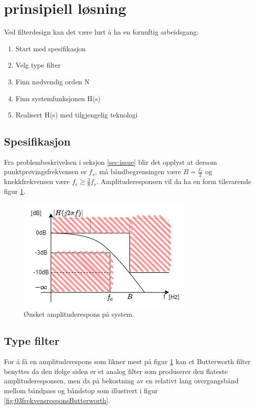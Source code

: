 \section{prinsipiell løsning}
\label{sec:concept}

Ved filterdesign kan det være lurt å ha en fornuftig arbeidsgang:
\begin{enumerate}
    \item Start med spesifikasjon
    \item Velg type filter
    \item Finn nødvendig orden N
    \item Finn systemfunksjonen H(s)
    \item Realisert H(s) med tilgjengelig teknologi
  \end{enumerate}

\subsection{Spesifikasjon}
\label{sec:spesifikasjon}
Fra problembeskrivelsen i seksjon \ref{sec:issue} blir det opplyst at dersom punktprøvingsfrekvensen er $f_s$, må båndbegrensingen være $B=\frac {f_s} {2}$ og knekkfrekvensen være $f_c \geq \frac{3}{8}f_s$. Amplituderesponsen vil da ha en form tilsvarende figur \ref{fig:02ønsketamplituderespons}.

\begin{figure}[!hbt]
	\centering
	\includegraphics[scale=0.7]{./Images/02Concept/01spesifikasjon.png}
	\caption{Ønsket amplituderespons på system.}
	\label{fig:02ønsketamplituderespons}
\end{figure}

\subsection{Type filter}
\label{sec:type_filter}

For å få en amplituderespons som likner mest på figur \ref{fig:02ønsketamplituderespons} kan et Butterworth filter benyttes da den ifølge siden \cite{storr_2013_butterworth} er et analog filter som produserer den flateste amplituderesponsen, men da på bekostning av en relativt lang overgangsbånd mellom båndpass og båndstop som illustrert i figur \ref{fig:03frekvensresponsButterworth}. 

